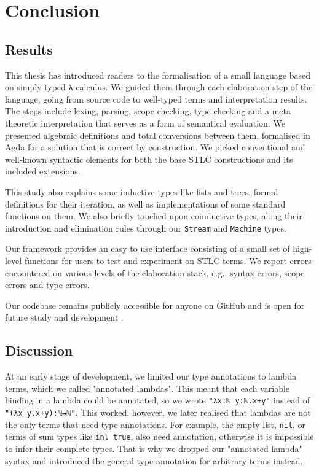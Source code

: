 \chapter{Conclusion}
\label{ch:conclusion}

\section{Results}

This thesis has introduced readers to the formalisation of a small language based on simply typed \verb$λ$-calculus. We guided them through each elaboration step of the language, going from source code to well-typed terms and interpretation results. The steps include lexing, parsing, scope checking, type checking and a meta theoretic interpretation that serves as a form of semantical evaluation. We presented algebraic definitions and total conversions between them, formalised in Agda for a solution that is correct by construction. We picked conventional and well-known syntactic elements for both the base STLC constructions and its included extensions.

This study also explains some inductive types like lists and trees, formal definitions for their iteration, as well as implementations of some standard functions on them. We also briefly touched upon coinductive types, along their introduction and elimination rules through our \verb$Stream$ and \verb$Machine$ types.

Our framework provides an easy to use interface consisting of a small set of high-level functions for users to test and experiment on STLC terms. We report errors encountered on various levels of the elaboration stack, e.g., syntax errors, scope errors and type errors.

Our codebase remains publicly accessible for anyone on GitHub and is open for future study and development \cite{home-repo}.

\section{Discussion}

At an early stage of development, we limited our type annotations to lambda terms, which we called "annotated lambdas". This meant that each variable binding in a lambda could be annotated, so we wrote \verb$"λx:ℕ y:ℕ.x+y"$ instead of \verb$"(λx y.x+y):ℕ→ℕ"$. This worked, however, we later realised that lambdas are not the only terms that need type annotations. For example, the empty list, \verb$nil$, or terms of sum types like \verb$inl true$, also need annotation, otherwise it is impossible to infer their complete types. That is why we dropped our "annotated lambda" syntax and introduced the general type annotation for arbitrary terms instead.

